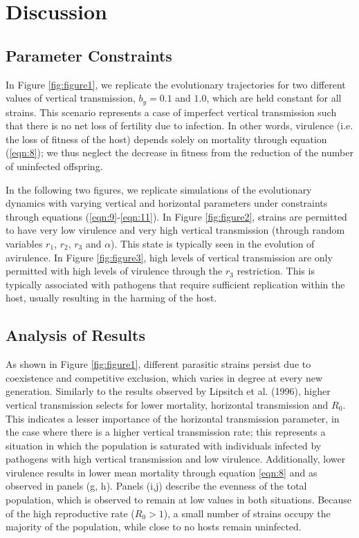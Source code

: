 \section{Discussion}
\subsection{Parameter Constraints}

In Figure \ref{fig:figure1}, we replicate the evolutionary trajectories for
two different values of vertical transmission, $b_y = 0.1$ and $1.0$, which
are held constant for all strains. This scenario represents a case of imperfect
vertical transmission such that there is no net loss of fertility due to
infection. In other words, virulence (i.e. the loss of fitness of the host)
depends solely on mortality through equation (\ref{eqn:8}); we thus neglect
the decrease in fitness from the reduction of the number of uninfected offspring.

In the following two figures, we replicate simulations of the evolutionary
dynamics with varying vertical and horizontal parameters under constraints
through equations (\ref{eqn:9}-\ref{eqn:11}). In Figure \ref{fig:figure2},
strains are permitted to have very low virulence and very high vertical
transmission (through random variables $r_1$, $r_2$, $r_3$ and $\alpha$). This
state is typically seen in the evolution of avirulence. In Figure
\ref{fig:figure3}, high levels of vertical transmission are only permitted with
high levels of virulence through the $r_3$ \in [0, $r_1$] restriction. This is
typically associated with pathogens that require sufficient replication within
the host, usually resulting in the harming of the host.

\subsection{Analysis of Results}
As shown in Figure \ref{fig:figure1}, different parasitic strains persist due
to coexistence and competitive exclusion, which varies in degree at every new
generation. Similarly to the results observed by Lipsitch et al.
(1996)\supercite{Lipsitch:1996}, higher vertical transmission selects for lower
mortality, horizontal transmission and $R_0$. This indicates a lesser importance
of the horizontal transmission parameter, in the case where there is a higher
vertical transmission rate; this represents a situation in which the population
is saturated with individuals infected by pathogens with high vertical
transmission and low virulence. Additionally, lower virulence results in lower
mean mortality through equation \ref{eqn:8} and as observed in panels (g, h).
Panels (i,j) describe the evenness of the total population, which is observed
to remain at low values in both situations. Because of the high reproductive
rate ($R_0 > 1$), a small number of strains occupy the majority of the
population, while close to no hosts remain uninfected.

